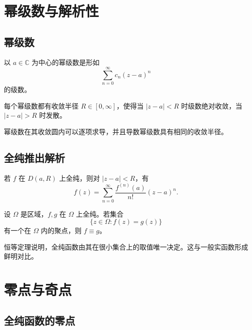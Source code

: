 \section{幂级数与解析性}

\subsection{幂级数}

\begin{definition}[幂级数]
以 $a\in\mathbb{C}$ 为中心的幂级数是形如
\[
    \sum_{n=0}^{\infty}c_n(z-a)^n
\]
的级数。
\end{definition}

\begin{theorem}[收敛半径]
每个幂级数都有收敛半径 $R\in[0,\infty]$，使得当 $|z-a|<R$ 时级数绝对收敛，当 $|z-a|>R$ 时发散。
\end{theorem}

\begin{theorem}[逐项求导]
幂级数在其收敛圆内可以逐项求导，并且导数幂级数具有相同的收敛半径。
\end{theorem}

\subsection{全纯推出解析}

\begin{theorem}
若 $f$ 在 $D(a,R)$ 上全纯，则对 $|z-a|<R$，有
\[
    f(z)=\sum_{n=0}^{\infty}\frac{f^{(n)}(a)}{n!}(z-a)^n.
\]
\end{theorem}

\begin{theorem}[恒等定理]
设 $\Omega$ 是区域，$f,g$ 在 $\Omega$ 上全纯。若集合
\[
    \{z\in\Omega:f(z)=g(z)\}
\]
有一个在 $\Omega$ 内的聚点，则 $f\equiv g$。
\end{theorem}

\begin{remark}
恒等定理说明，全纯函数由其在很小集合上的取值唯一决定。这与一般实函数形成鲜明对比。
\end{remark}

\section{零点与奇点}

\subsection{全纯函数的零点}

